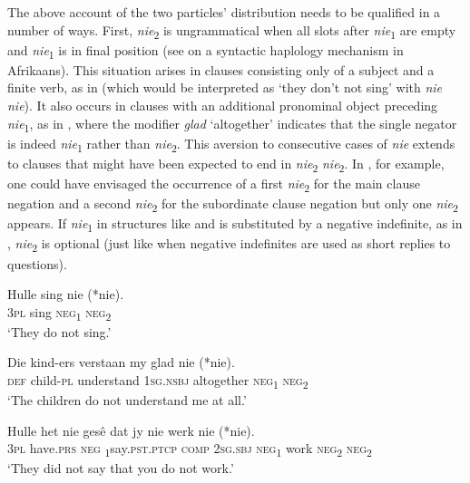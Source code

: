 \documentclass[output=paper,colorlinks,citecolor=brown]{langscibook}
\begin{document}
The above account of the two particles’ distribution needs to be qualified in a number of ways. First, \textit{nie}\textsubscript{2} is ungrammatical when all slots after \textit{nie}\textsubscript{1} are empty and \textit{nie}\textsubscript{1} is in final position (see \citealt[31]{Biberauer2007}  on a syntactic haplology mechanism in Afrikaans). This situation arises in clauses consisting only of a subject and a finite verb, as in  (which would be interpreted as ‘they don’t not sing’ with \textit{nie nie}). It also occurs in clauses with an additional pronominal object preceding \textit{nie}\textsubscript{1}, as in , where the modifier \textit{glad} ‘altogether’ indicates that the single negator is indeed \textit{nie}\textsubscript{1} rather than \textit{nie}\textsubscript{2}. This aversion to consecutive cases of \textit{nie} extends to clauses that might have been expected to end in \textit{nie}\textsubscript{2} \textit{nie}\textsubscript{2}. In , for example, one could have envisaged the occurrence of a first \textit{nie}\textsubscript{2} for the main clause negation and a second \textit{nie}\textsubscript{2} for the subordinate clause negation but only one \textit{nie}\textsubscript{2} appears. If \textit{nie}\textsubscript{1} in structures like  and  is substituted by a negative indefinite, as in , \textit{nie}\textsubscript{2} is optional (just like when negative indefinites are used as short replies to questions).

\ea\label{ex:afr:6}
    \ea\label{ex:afr:6a}
        \gll Hulle sing nie (*nie). \\ 
             \textsc{3pl} sing \textsc{neg}\textsubscript{1} \textsc{neg}\textsubscript{2} \\
        \glt ‘They do not sing.’
    
    \ex\label{ex:afr:6b}
        \gll Die kind-ers verstaan my glad nie (*nie). \\
             \textsc{def} child-\textsc{pl} understand \textsc{1sg.nsbj} altogether \textsc{neg}\textsubscript{1} \textsc{neg}\textsubscript{2}\\
        \glt ‘The children do not understand me at all.’
    
    \ex\label{ex:afr:6c}
        \gll Hulle het nie gesê dat jy nie werk nie (*nie). \\ 
              3\textsc{pl} have.\textsc{prs} \textsc{neg} \textsubscript{1}say.\textsc{pst.ptcp} \textsc{comp} \textsc{2sg.sbj} \textsc{neg}\textsubscript{1} work \textsc{neg}\textsubscript{2} \textsc{neg}\textsubscript{2} \\
        \glt ‘They did not say that you do not work.’
    
\end{document}
